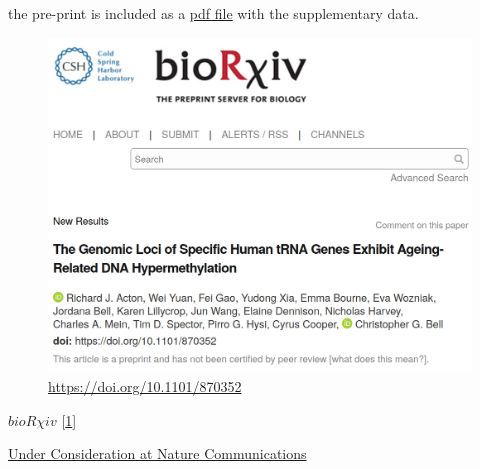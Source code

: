 \documentclass[
]{book}
\begin{document}
the pre-print is included as a \href{Supplementary_Files/SF10_tRNApaper.pdf}{pdf file} with the supplementary data.

\begin{figure}
\centering
\includegraphics{figs/biorxiv_screenshot.png}
\caption{\url{https://doi.org/10.1101/870352}}
\end{figure}

\href{https://doi.org/10.1101/870352}{\(bioR \chi iv\)} {[}\protect\hyperlink{ref-Acton2020}{1}{]}

\href{https://nature-research-under-consideration.nature.com/users/37265-nature-communications/posts/57741-the-genomic-loci-of-specific-human-trna-genes-exhibit-ageing-related-dna-hypermethylation}{Under Consideration at Nature Communications}
\end{document}
